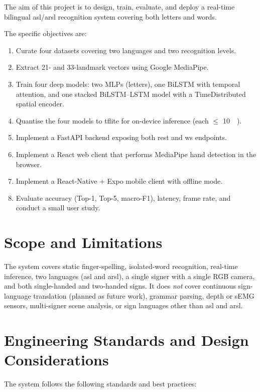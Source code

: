 The aim of this project is to design, train, evaluate, and deploy a
real-time bilingual \gls{asl}/\gls{arsl} recognition system covering both
letters and words.

The specific objectives are:
\begin{enumerate}
  \item Curate four datasets covering two languages and two recognition
        levels.
  \item Extract 21- and 33-landmark vectors using Google MediaPipe.
  \item Train four deep models: two MLPs (letters), one BiLSTM with
        temporal attention, and one stacked BiLSTM--LSTM model with a
        TimeDistributed spatial encoder.
  \item Quantise the four models to \gls{tflite} for on-device inference
        (each $\leq$ \SI{10}{\mega\byte}).
  \item Implement a FastAPI backend exposing both \gls{rest} and \gls{ws}
        endpoints.
  \item Implement a React web client that performs MediaPipe hand
        detection in the browser.
  \item Implement a React-Native + Expo mobile client with offline mode.
  \item Evaluate accuracy (Top-1, Top-5, macro-F1), latency, frame rate,
        and conduct a small user study.
\end{enumerate}

\section{Scope and Limitations}
\label{sec:intro:scope}

The system covers static finger-spelling, isolated-word recognition,
real-time inference, two languages (\gls{asl} and \gls{arsl}), a single
signer with a single RGB camera, and both single-handed and two-handed
signs. It does \emph{not} cover continuous sign-language translation
(planned as future work), grammar parsing, depth or sEMG sensors,
multi-signer scene analysis, or sign languages other than \gls{asl} and
\gls{arsl}.

\section{Engineering Standards and Design Considerations}
\label{sec:intro:standards}

The system follows the following standards and best practices:

